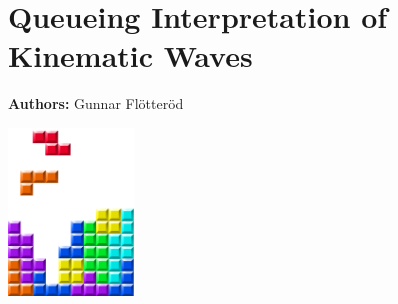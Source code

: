 \chapter{Queueing Interpretation of Kinematic Waves }
\label{ch:kinematicwaves}

\hfill \textbf{Authors:} Gunnar Flötteröd

\begin{center} \includegraphics[width=0.25\textwidth, angle=0]{figures/MATSimBook.png} \end{center}

